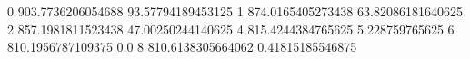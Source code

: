 0 903.7736206054688 93.57794189453125
1 874.0165405273438 63.82086181640625
2 857.1981811523438 47.00250244140625
4 815.4244384765625 5.228759765625
6 810.1956787109375 0.0
8 810.6138305664062 0.41815185546875
